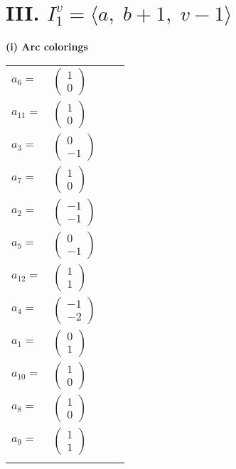 \documentclass[1p]{elsarticle_modified}
\theoremstyle{definition}
\begin{document}
\centering \section*{III. $I^v_{1}= \langle a,\;b+1,\;v-1 \rangle$}
\flushleft \textbf{(i) Arc colorings}\\
\begin{tabular}{m{7pt} m{180pt} m{7pt} m{180pt} }
\flushright $a_{6}=$&$\begin{pmatrix}1\\0\end{pmatrix}$ \\
\flushright $a_{11}=$&$\begin{pmatrix}1\\0\end{pmatrix}$ \\
\flushright $a_{3}=$&$\begin{pmatrix}0\\-1\end{pmatrix}$ \\
\flushright $a_{7}=$&$\begin{pmatrix}1\\0\end{pmatrix}$ \\
\flushright $a_{2}=$&$\begin{pmatrix}-1\\-1\end{pmatrix}$ \\
\flushright $a_{5}=$&$\begin{pmatrix}0\\-1\end{pmatrix}$ \\
\flushright $a_{12}=$&$\begin{pmatrix}1\\1\end{pmatrix}$ \\
\flushright $a_{4}=$&$\begin{pmatrix}-1\\-2\end{pmatrix}$ \\
\flushright $a_{1}=$&$\begin{pmatrix}0\\1\end{pmatrix}$ \\
\flushright $a_{10}=$&$\begin{pmatrix}1\\0\end{pmatrix}$ \\
\flushright $a_{8}=$&$\begin{pmatrix}1\\0\end{pmatrix}$ \\
\flushright $a_{9}=$&$\begin{pmatrix}1\\1\end{pmatrix}$\\&\end{tabular}
\end{document}
